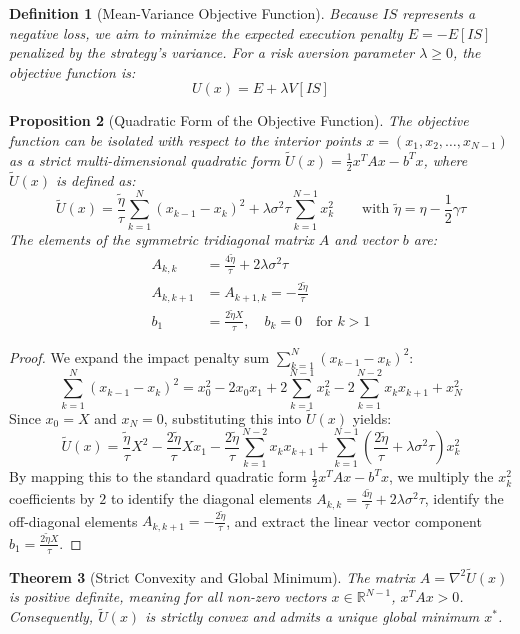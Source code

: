 \documentclass[11pt,a4paper]{article}
\newtheorem{theorem}{Theorem}[section]
\newtheorem{proposition}[theorem]{Proposition}
\newtheorem{definition}[theorem]{Definition}
\begin{document}
\begin{definition}[Mean-Variance Objective Function]
Because $IS$ represents a negative loss, we aim to minimize the expected execution penalty $E = -E[IS]$ penalized by the strategy's variance. For a risk aversion parameter $\lambda \geq 0$, the objective function is:
\[ U(x) = E + \lambda V[IS] \]
\end{definition}

\begin{proposition}[Quadratic Form of the Objective Function]
The objective function can be isolated with respect to the interior points $x = (x_1, x_2, \dots, x_{N-1})$ as a strict multi-dimensional quadratic form $\tilde{U}(x) = \frac{1}{2} x^T A x - b^T x$, where $\tilde{U}(x)$ is defined as:
\[ \tilde{U}(x) = \frac{\tilde{\eta}}{\tau} \sum_{k=1}^{N} (x_{k-1} - x_k)^2 + \lambda \sigma^2 \tau \sum_{k=1}^{N-1} x_k^2 \qquad \text{with } \tilde{\eta} = \eta - \frac{1}{2} \gamma \tau \]
The elements of the symmetric tridiagonal matrix $A$ and vector $b$ are:
\begin{align*}
A_{k,k} &= \frac{4\tilde{\eta}}{\tau} + 2 \lambda \sigma^2 \tau \\
A_{k, k+1} &= A_{k+1, k} = -\frac{2\tilde{\eta}}{\tau} \\
b_1 &= \frac{2\tilde{\eta}X}{\tau}, \quad b_k = 0 \quad \text{for } k > 1
\end{align*}
\end{proposition}

\begin{proof}
We expand the impact penalty sum $\sum_{k=1}^{N} (x_{k-1} - x_k)^2$:
\[ \sum_{k=1}^{N} (x_{k-1} - x_k)^2 = x_0^2 - 2x_0 x_1 + 2\sum_{k=1}^{N-1} x_k^2 - 2\sum_{k=1}^{N-2} x_k x_{k+1} + x_N^2 \]
Since $x_0 = X$ and $x_N = 0$, substituting this into $\tilde{U}(x)$ yields:
\[ \tilde{U}(x) = \frac{\tilde{\eta}}{\tau} X^2 - \frac{2\tilde{\eta}}{\tau} X x_1 - \frac{2\tilde{\eta}}{\tau} \sum_{k=1}^{N-2} x_k x_{k+1} + \sum_{k=1}^{N-1} \left( \frac{2\tilde{\eta}}{\tau} + \lambda \sigma^2 \tau \right) x_k^2 \]
By mapping this to the standard quadratic form $\frac{1}{2}x^T A x - b^T x$, we multiply the $x_k^2$ coefficients by $2$ to identify the diagonal elements $A_{k,k} = \frac{4\tilde{\eta}}{\tau} + 2\lambda \sigma^2 \tau$, identify the off-diagonal elements $A_{k,k+1} = -\frac{2\tilde{\eta}}{\tau}$, and extract the linear vector component $b_1 = \frac{2\tilde{\eta}X}{\tau}$.
\end{proof}

\begin{theorem}[Strict Convexity and Global Minimum]
The matrix $A = \nabla^2 \tilde{U}(x)$ is positive definite, meaning for all non-zero vectors $x \in \mathbb{R}^{N-1}$, $x^T A x > 0$. Consequently, $\tilde{U}(x)$ is strictly convex and admits a unique global minimum $x^*$.
\end{theorem}
\end{document}

